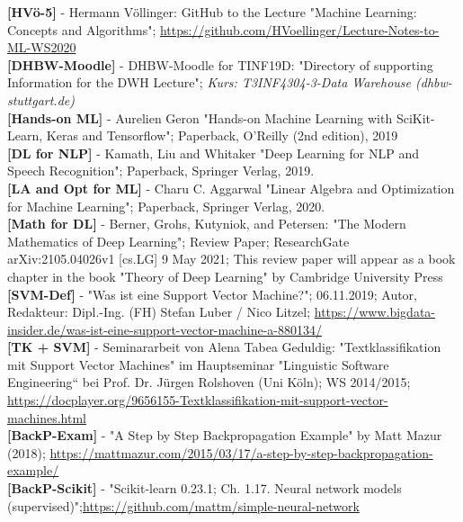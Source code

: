 \documentclass[12pt]{article}
\begin{document}
\textbf{[HVö-5]} - Hermann Völlinger: GitHub to the Lecture "Machine Learning: Concepts and Algorithms"; \url{https://github.com/HVoellinger/Lecture-Notes-to-ML-WS2020}\\

\textbf{[DHBW-Moodle]} - DHBW-Moodle for TINF19D: "Directory of supporting Information for the DWH Lecture"; \textit{Kurs: T3INF4304-3-Data Warehouse (dhbw-stuttgart.de)}\\

\textbf{[Hands-on ML]} - Aurelien Geron "Hands-on Machine Learning with SciKit-Learn, Keras and Tensorflow"; Paperback, O'Reilly (2nd edition), 2019\\

\textbf{[DL for NLP]} - Kamath, Liu and Whitaker "Deep Learning for NLP and Speech Recognition"; Paperback, Springer Verlag, 2019.\\

\textbf{[LA and Opt for ML]} - Charu C. Aggarwal "Linear Algebra and Optimization for Machine Learning"; Paperback, Springer Verlag, 2020.\\

\textbf{[Math for DL]} - Berner, Grohs, Kutyniok, and Petersen: "The Modern Mathematics of Deep Learning"; Review Paper; ResearchGate arXiv:2105.04026v1 [cs.LG] 9 May 2021; This review paper will appear as a book chapter in the book "Theory of Deep Learning" by Cambridge University Press\\

\textbf{[SVM-Def]} - "Was ist eine Support Vector Machine?"; 06.11.2019; Autor, Redakteur: Dipl.-Ing. (FH) Stefan Luber / Nico Litzel; \url{https://www.bigdata-insider.de/was-ist-eine-support-vector-machine-a-880134/}\\

\textbf{[TK + SVM]} - Seminararbeit von Alena Tabea Geduldig: "Textklassifikation mit Support Vector Machines" im  Hauptseminar "Linguistic Software Engineering“ bei Prof. Dr. Jürgen Rolshoven (Uni Köln); WS 2014/2015; \url{https://docplayer.org/9656155-Textklassifikation-mit-support-vector-machines.html}\\

\textbf{[BackP-Exam]} - "A Step by Step Backpropagation Example" by Matt Mazur (2018); \url{https://mattmazur.com/2015/03/17/a-step-by-step-backpropagation-example/}\\

\textbf{[BackP-Scikit]} - "Scikit-learn 0.23.1; Ch. 1.17. Neural network models (supervised)";\url{https://github.com/mattm/simple-neural-network}\\
\end{document}
